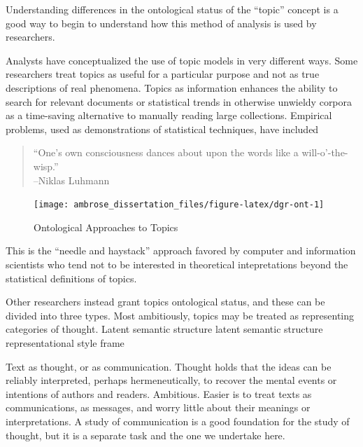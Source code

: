 \documentclass[]{book}
\begin{document}
Understanding differences in the ontological status of the ``topic''
concept is a good way to begin to understand how this method of analysis
is used by researchers.

Analysts have conceptualized the use of topic models in very different
ways. Some researchers treat topics as useful for a particular purpose
and not as true descriptions of real phenomena. Topics as information
enhances the ability to search for relevant documents or statistical
trends in otherwise unwieldy corpora as a time-saving alternative to
manually reading large collections. \citep{Boyd-Graber2017Applications}
Empirical problems, used as demonstrations of statistical techniques,
have included

\begin{quote}
``One's own consciousness dances about upon the words like a
will-o'-the-wisp.''\\
--Niklas Luhmann \citeyearpar[166]{Luhmann2002Theories}
\end{quote}

\begin{figure}

{\centering \texttt{[image: ambrose\_dissertation\_files/figure-latex/dgr-ont-1]} 

}

\caption{Ontological Approaches to Topics}\label{fig:dgr-ont}
\end{figure}

This is the ``needle and haystack'' approach favored by computer and
information scientists who tend not to be interested in theoretical
intepretations beyond the statistical definitions of topics.

Other researchers instead grant topics ontological status, and these can
be divided into three types. Most ambitiously, topics may be treated as
representing categories of thought. Latent semantic structure latent
semantic structure \citep{WallachStatisticalTopicModels2011}
representational style \citep{Grimmer2016Measuring} frame
\citep{DiMaggio2013Exploiting}

Text as thought, or as communication. Thought holds that the ideas can
be reliably interpreted, perhaps hermeneutically, to recover the mental
events or intentions of authors and readers. Ambitious. Easier is to
treat texts as communications, as messages, and worry little about their
meanings or interpretations. A study of communication is a good
foundation for the study of thought, but it is a separate task and the
one we undertake here.
\end{document}
